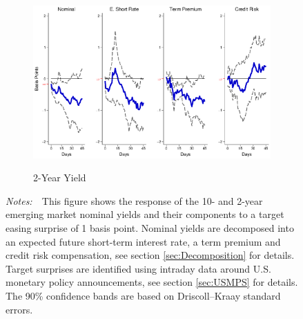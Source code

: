 \documentclass[a4paper, 12pt]{article}
\newcommand{\figtext}[1]{
	\vspace{-1ex}
	\captionsetup{justification=justified,font=footnotesize}
	\caption*{#1}
}
\newcommand{\fignotes}[1]{\figtext{\emph{Notes:~}~#1}}
\begin{document}
{\begin{landscape}
\begin{figure}[tbph]
\begin{center}
\begin{minipage}{\linewidth}
\begin{center}
						
						\begin{subfigure}[t]{\linewidth}
							\includegraphics[trim={0cm 0cm 0cm 0cm},clip,height=0.35\textheight,width=\linewidth]{../Figures/TargetEMnomyptpphi24m.eps} \\
							\vspace{-0.35cm}
							\caption{2-Year Yield} \label{subfig:LPEM2Ytarget}
						\end{subfigure}
						\vspace{-0.45cm}
					\end{center}
					\fignotes{This figure shows the response of the 10- and 2-year emerging market nominal yields and their components to a target easing surprise of 1 basis point. Nominal yields are decomposed into an expected future short-term interest rate, a term premium and credit risk compensation, see section \ref{sec:Decomposition} for details. Target surprises are identified using intraday data around U.S. monetary policy announcements, see section \ref{sec:USMPS} for details. The 90\% confidence bands are based on Driscoll--Kraay standard errors.}
				\end{minipage}
			\end{center}
		\end{figure}
		
		\pagebreak[4]
		

\end{landscape}}
\end{document}
